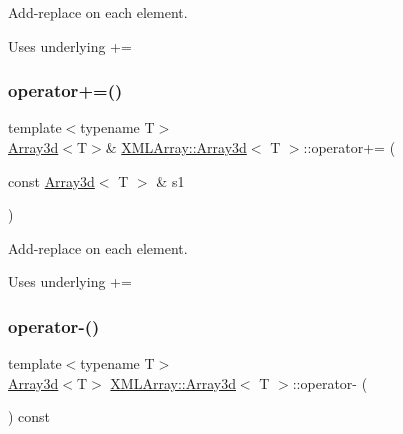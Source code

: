 Add-\/replace on each element. 

Uses underlying += \mbox{\label{classXMLArray_1_1Array3d_add116e7a7b9da853f2b463d5fb3a9b1e}} 
\subsubsection{\texorpdfstring{operator+=()}{operator+=()}\hspace{0.1cm}{\footnotesize\ttfamily [2/2]}}
{\footnotesize\ttfamily template$<$typename T$>$ \\
\mbox{\hyperlink{classXMLArray_1_1Array3d}{Array3d}}$<$T$>$\& \mbox{\hyperlink{classXMLArray_1_1Array3d}{X\+M\+L\+Array\+::\+Array3d}}$<$ T $>$\+::operator+= (\begin{DoxyParamCaption}\item[{const \mbox{\hyperlink{classXMLArray_1_1Array3d}{Array3d}}$<$ T $>$ \&}]{s1 }\end{DoxyParamCaption})\hspace{0.3cm}{\ttfamily [inline]}}



Add-\/replace on each element. 

Uses underlying += \mbox{\label{classXMLArray_1_1Array3d_ae6a356b75bd22316f0d4f94beea360d9}} 
\subsubsection{\texorpdfstring{operator-\/()}{operator-()}\hspace{0.1cm}{\footnotesize\ttfamily [1/2]}}
{\footnotesize\ttfamily template$<$typename T$>$ \\
\mbox{\hyperlink{classXMLArray_1_1Array3d}{Array3d}}$<$T$>$ \mbox{\hyperlink{classXMLArray_1_1Array3d}{X\+M\+L\+Array\+::\+Array3d}}$<$ T $>$\+::operator-\/ (\begin{DoxyParamCaption}{ }\end{DoxyParamCaption}) const\hspace{0.3cm}{\ttfamily [inline]}}




